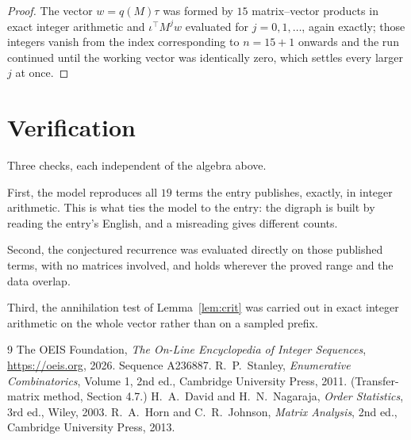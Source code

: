 \documentclass[11pt,a4paper]{article}
\theoremstyle{plain}
\theoremstyle{definition}
\begin{document}
\begin{proof}
The vector $w=q(M)\tau$ was formed by $15$ matrix--vector products in exact integer
arithmetic and $\iota^{\!\top}M^{j}w$ evaluated for $j=0,1,\dots$, again exactly; those
integers vanish from the index corresponding to $n=15+1$ onwards and the run continued
until the working vector was identically zero, which settles every larger $j$ at once.
\end{proof}

\section{Verification}

Three checks, each independent of the algebra above.

First, the model reproduces all $19$ terms the entry publishes, exactly, in integer
arithmetic. This is what ties the model to the entry: the digraph is built by reading the
entry's English, and a misreading gives different counts.

Second, the conjectured recurrence was evaluated directly on those published terms, with no
matrices involved, and holds wherever the proved range and the data overlap.

Third, the annihilation test of Lemma~\ref{lem:crit} was carried out in exact integer
arithmetic on the whole vector rather than on a sampled prefix.

\begin{thebibliography}{9}
 The OEIS Foundation, \emph{The On-Line Encyclopedia of Integer
Sequences}, \url{https://oeis.org}, 2026. Sequence A236887.
 R.~P.~Stanley, \emph{Enumerative Combinatorics}, Volume 1, 2nd ed.,
Cambridge University Press, 2011. (Transfer-matrix method, Section 4.7.)
 H.~A.~David and H.~N.~Nagaraja, \emph{Order Statistics}, 3rd ed., Wiley,
2003.
 R.~A.~Horn and C.~R.~Johnson, \emph{Matrix Analysis}, 2nd ed., Cambridge
University Press, 2013.
\end{thebibliography}
\end{document}
